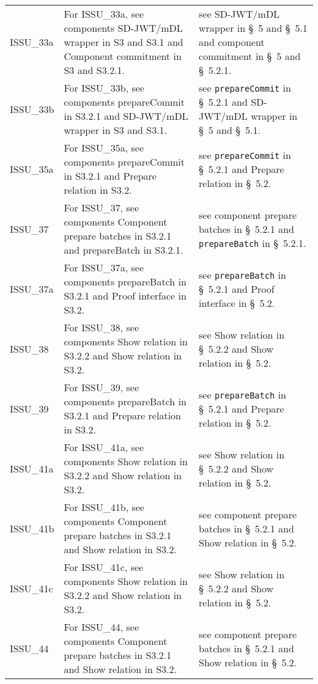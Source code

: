 \begin{landscape}
\begin{longtable}{p{3cm} p{10cm} p{7cm}}
ISSU\_33a &
For ISSU\_33a, see components SD-JWT/mDL wrapper in S3 and S3.1 and Component commitment in S3 and S3.2.1. &
see SD-JWT/mDL wrapper in \S~5 and \S~5.1 and component commitment in \S~5 and \S~5.2.1. \\

ISSU\_33b &
For ISSU\_33b, see components prepareCommit in S3.2.1 and SD-JWT/mDL wrapper in S3 and S3.1. &
see \texttt{prepareCommit} in \S~5.2.1 and SD-JWT/mDL wrapper in \S~5 and \S~5.1. \\

ISSU\_35a &
For ISSU\_35a, see components prepareCommit in S3.2.1 and Prepare relation in S3.2. &
see \texttt{prepareCommit} in \S~5.2.1 and Prepare relation in \S~5.2. \\

ISSU\_37 &
For ISSU\_37, see components Component prepare batches in S3.2.1 and prepareBatch in S3.2.1. &
see component prepare batches in \S~5.2.1 and \texttt{prepareBatch} in \S~5.2.1. \\

ISSU\_37a &
For ISSU\_37a, see components prepareBatch in S3.2.1 and Proof interface in S3.2. &
see \texttt{prepareBatch} in \S~5.2.1 and Proof interface in \S~5.2. \\

ISSU\_38 &
For ISSU\_38, see components Show relation in S3.2.2 and Show relation in S3.2. &
see Show relation in \S~5.2.2 and Show relation in \S~5.2. \\

ISSU\_39 &
For ISSU\_39, see components prepareBatch in S3.2.1 and Prepare relation in S3.2. &
see \texttt{prepareBatch} in \S~5.2.1 and Prepare relation in \S~5.2. \\

ISSU\_41a &
For ISSU\_41a, see components Show relation in S3.2.2 and Show relation in S3.2. &
see Show relation in \S~5.2.2 and Show relation in \S~5.2. \\

ISSU\_41b &
For ISSU\_41b, see components Component prepare batches in S3.2.1 and Show relation in S3.2. &
see component prepare batches in \S~5.2.1 and Show relation in \S~5.2. \\

ISSU\_41c &
For ISSU\_41c, see components Show relation in S3.2.2 and Show relation in S3.2. &
see Show relation in \S~5.2.2 and Show relation in \S~5.2. \\

ISSU\_44 &
For ISSU\_44, see components Component prepare batches in S3.2.1 and Show relation in S3.2. &
see component prepare batches in \S~5.2.1 and Show relation in \S~5.2. \\


\end{longtable}
\end{landscape}
